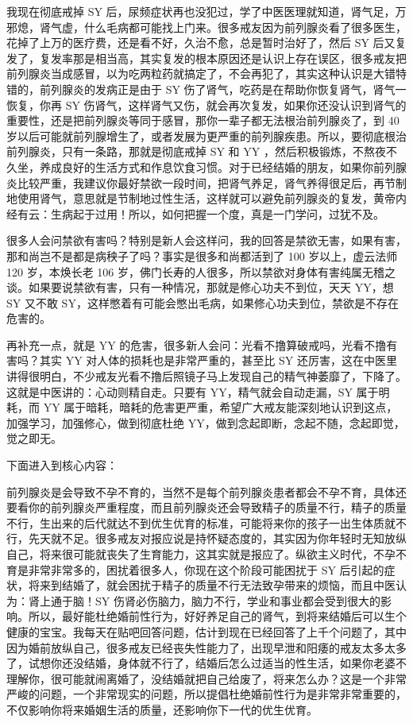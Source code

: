 \documentclass[fontset=founder]{ctexart}
\begin{document}
我现在彻底戒掉 SY 后，尿频症状再也没犯过，学了中医医理就知道，肾气足，万邪熄，肾气虚，什么毛病都可能找上门来。很多戒友因为前列腺炎看了很多医生，花掉了上万的医疗费，还是看不好，久治不愈，总是暂时治好了，然后 SY 后又复发了，复发率那是相当高，其实复发的根本原因还是认识上存在误区，很多戒友把前列腺炎当成感冒，以为吃两粒药就搞定了，不会再犯了，其实这种认识是大错特错的，前列腺炎的发病正是由于 SY 伤了肾气，吃药是在帮助你恢复肾气，肾气一恢复，你再 SY 伤肾气，这样肾气又伤，就会再次复发，如果你还没认识到肾气的重要性，还是把前列腺炎等同于感冒，那你一辈子都无法根治前列腺炎了，到 40 岁以后可能就前列腺增生了，或者发展为更严重的前列腺疾患。所以，要彻底根治前列腺炎，只有一条路，那就是彻底戒掉 SY 和 YY ，然后积极锻炼，不熬夜不久坐，养成良好的生活方式和作息饮食习惯。对于已经结婚的朋友，如果你前列腺炎比较严重，我建议你最好禁欲一段时间，把肾气养足，肾气养得很足后，再节制地使用肾气，意思就是节制地过性生活，这样就可以避免前列腺炎的复发，黄帝内经有云：生病起于过用！所以，如何把握一个度，真是一门学问，过犹不及。

很多人会问禁欲有害吗？特别是新人会这样问，我的回答是禁欲无害，如果有害，那和尚岂不是都是病秧子了吗？事实是很多和尚都活到了 100 岁以上，虚云法师 120 岁，本焕长老 106 岁，佛门长寿的人很多，所以禁欲对身体有害纯属无稽之谈。如果要说禁欲有害，只有一种情况，那就是修心功夫不到位，天天 YY，想 SY 又不敢 SY，这样憋着有可能会憋出毛病，如果修心功夫到位，禁欲是不存在危害的。

再补充一点，就是 YY 的危害，很多新人会问：光看不撸算破戒吗，光看不撸有害吗？其实 YY 对人体的损耗也是非常严重的，甚至比 SY 还厉害，这在中医里讲得很明白，不少戒友光看不撸后照镜子马上发现自己的精气神萎靡了，下降了。这就是中医讲的：心动则精自走。只要有 YY，精气就会自动走漏，SY 属于明耗，而 YY 属于暗耗，暗耗的危害更严重，希望广大戒友能深刻地认识到这点，加强学习，加强修心，做到彻底杜绝 YY，做到念起即断，念起不随，念起即觉，觉之即无。

下面进入到核心内容：

前列腺炎是会导致不孕不育的，当然不是每个前列腺炎患者都会不孕不育，具体还要看你的前列腺炎严重程度，而且前列腺炎还会导致精子的质量不行，精子的质量不行，生出来的后代就达不到优生优育的标准，可能将来你的孩子一出生体质就不行，先天就不足。很多戒友对报应说是持怀疑态度的，其实因为你年轻时无知放纵自己，将来很可能就丧失了生育能力，这其实就是报应了。纵欲主义时代，不孕不育是非常非常多的，困扰着很多人，你现在这个阶段可能困扰于 SY 后引起的症状，将来到结婚了，就会困扰于精子的质量不行无法致孕带来的烦恼，而且中医认为：肾上通于脑！SY 伤肾必伤脑力，脑力不行，学业和事业都会受到很大的影响。所以，最好能杜绝婚前性行为，好好养足自己的肾气，到将来结婚后可以生个健康的宝宝。我每天在贴吧回答问题，估计到现在已经回答了上千个问题了，其中因为婚前放纵自己，很多戒友已经丧失性能力了，出现早泄和阳痿的戒友太多太多了，试想你还没结婚，身体就不行了，结婚后怎么过适当的性生活，如果你老婆不理解你，很可能就闹离婚了，没结婚就把自己给废了，将来怎么办？这是一个非常严峻的问题，一个非常现实的问题，所以提倡杜绝婚前性行为是非常非常重要的，不仅影响你将来婚姻生活的质量，还影响你下一代的优生优育。
\end{document}
